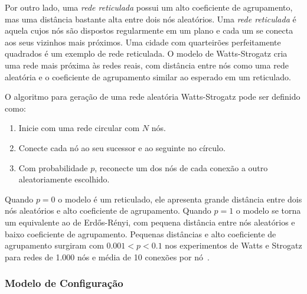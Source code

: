 \documentclass[12pt,a4paper,final]{article}
\begin{document}

Por outro lado, uma \textit{rede reticulada} possui um alto coeficiente de agrupamento, mas uma distância bastante alta entre dois nós aleatórios. Uma \textit{rede reticulada} é aquela cujos nós são dispostos regularmente em um plano e cada um se conecta aos seus vizinhos mais próximos. Uma cidade com quarteirões perfeitamente quadrados é um exemplo de rede reticulada. O modelo de Watts-Strogatz cria uma rede mais próxima às redes reais, com distância entre nós como uma rede aleatória e o coeficiente de agrupamento similar ao esperado em um reticulado.

O algoritmo para geração de uma rede aleatória Watts-Strogatz pode ser definido como:

\begin{enumerate}
\item Inicie com uma rede circular com $N$ nós.

\item Conecte cada nó ao seu sucessor e ao seguinte no círculo.

\item Com probabilidade $p$, reconecte um dos nós de cada conexão a outro aleatoriamente escolhido.
\end{enumerate}

Quando $p = 0$ o modelo é um reticulado, ele apresenta grande distância entre dois nós aleatórios e alto coeficiente de agrupamento. Quando $p = 1$ o modelo se torna um equivalente ao de Erdős-Rényi, com pequena distância entre nós aleatórios e baixo coeficiente de agrupamento. Pequenas distâncias e alto coeficiente de agrupamento surgiram com $0.001 < p < 0.1$ nos experimentos de Watts e Strogatz para redes de 1.000 nós e média de 10 conexões por nó~\cite{Watts1998-wt}.

\subsubsection{Modelo de Configuração} \label{sec:modelo-configuracao}
\end{document}
